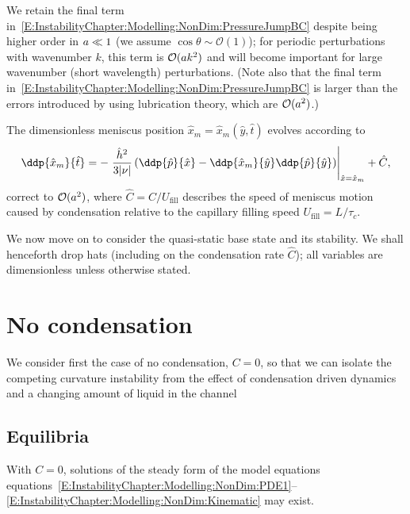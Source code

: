 We retain the final term in~\eqref{E:InstabilityChapter:Modelling:NonDim:PressureJumpBC} despite being higher order in $a \ll 1$ (we assume $\cos \theta \sim \mathcal{O}(1)$); for periodic perturbations with wavenumber $k$, this term is $\mathcal{O}(a k^2)$ and will become important for large wavenumber (short wavelength) perturbations. (Note also that the final term in~\eqref{E:InstabilityChapter:Modelling:NonDim:PressureJumpBC} is larger than the errors introduced by using lubrication theory, which are $\mathcal{O}(a^2)$.)

The dimensionless meniscus position $\hat{x}_m = \hat{x}_m(\hat{y}, \hat{t})$ evolves according to
\begin{equation}\label{E:InstabilityChapter:Modelling:NonDim:Kinematic}
\ddp{ \hat{x} _m}{\hat{t}} = -\left.\frac{\hat{h}^2}{3|\nu|}\left(\ddp{\hat{p}}{\hat{x}} - \ddp{\hat{x}_m}{\hat{y}}\ddp{\hat{p}}{\hat{y}} \right)  \right|_{\hat{x} = \hat{x}_m} +  \hat{C},
\end{equation}
correct to $\mathcal{O}(a^2)$, where $\hat{C} = C/U_\text{fill}$ describes the speed of meniscus motion caused by condensation relative to the capillary filling speed $U_\text{fill} = L/\tau_{c}$.

We now move on to consider the quasi-static base state and its stability. We shall henceforth drop hats (including on the condensation rate $\hat{C}$); all variables are dimensionless unless otherwise stated.

\section{No condensation}\label{S:InstabilityChapter:SlowCondensation}
\renewcommand{\varepsilon}{\delta} %
\newcommand{\param}{\xi} %
We consider first the case of no condensation, $C = 0$, so that we can isolate the competing curvature instability from the effect of condensation driven dynamics and a changing amount of liquid in the channel

\subsection{Equilibria}\label{S:InstabilityChapter:BaseState:Equilibria}
With $C = 0$, solutions of the steady form of the model equations equations~\eqref{E:InstabilityChapter:Modelling:NonDim:PDE1}--\eqref{E:InstabilityChapter:Modelling:NonDim:Kinematic} may exist.

